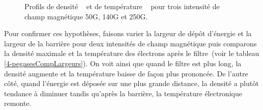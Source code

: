 \begin{refsection}
	\begin{figure}[!htbp]
  \centering
    \caption{Profils de densité ~ et de
    température ~ pour trois intensité de
    champ magnétique 50G, 140G et 250G.}
    \label{4-pegasesCompMagProfile}
\end{figure}

Pour confirmer ces hypothèses, faisons varier la largeur de dépôt d'énergie
et la largeur de la barrière pour deux intensités de champ magnétique puis
comparons la densité maximale et la température des électrons après le
filtre~(voir le tableau \ref{4-pegasesCompLargeurs}). On voit ainsi que quand le
filtre est plus long, la densité augmente et la température baisse de façon plus
prononcée.
De l'autre côté, quand l'énergie est déposée sur une plus grande distance, la
densité a plutôt tendance à diminuer tandis qu'après la barrière, la
température électronique remonte.


\end{refsection}
